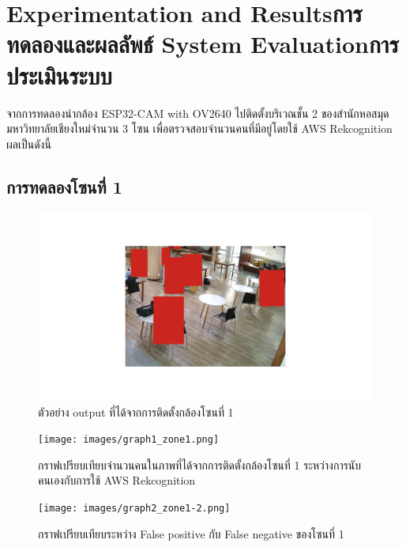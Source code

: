 \chapter{\ifproject%
\ifenglish Experimentation and Results\else การทดลองและผลลัพธ์\fi
\else%
\ifenglish System Evaluation\else การประเมินระบบ\fi
\fi}
\hspace{10mm} จากการทดลองนำกล้อง ESP32-CAM with OV2640 ไปติดตั้งบริเวณชั้น 2 ของสำนักหอสมุดมหาวิทยาลัยเชียงใหม่จำนวน 3 โซน เพื่อตรวจสอบจำนวนคนที่มีอยู่โดยใช้ AWS Rekcognition ผลเป็นดังนี้

\section{การทดลองโซนที่ 1}
\begin{figure}[ht]
    \includegraphics[width=\textwidth]{images/modified_Picture (100).png}
    \caption[ตัวอย่าง output ที่ได้จากการติดตั้งกล้องโซนที่ 1]{ตัวอย่าง output ที่ได้จากการติดตั้งกล้องโซนที่ 1}
    \label{fig:output1}
\end{figure}
\newpage
\begin{figure}[ht]
    \centering
    \texttt{[image: images/graph1\_zone1.png]}
    \caption[กราฟเปรียบเทียบจำนวนคนในภาพที่ได้จากการติดตั้งกล้องโซนที่ 1 ระหว่างการนับคนเองกับการใช้ AWS Rekcognition]{กราฟเปรียบเทียบจำนวนคนในภาพที่ได้จากการติดตั้งกล้องโซนที่ 1 ระหว่างการนับคนเองกับการใช้ AWS Rekcognition}
    \label{fig:graph1-1}
\end{figure}
\newpage
\begin{figure}[ht]
    \centering
    \texttt{[image: images/graph2\_zone1-2.png]}
    \caption[กราฟเปรียบเทียบระหว่าง False positive กับ False negative ของโซนที่ 1]{กราฟเปรียบเทียบระหว่าง False positive กับ False negative ของโซนที่ 1}
    \label{fig:graph2-1}
\end{figure}


